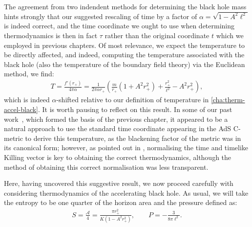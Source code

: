 \documentclass[
twoside,
openright,
frontopenright,
]{dmathesis}
\newcommand{\tcr}{\textcolor{red}}
\begin{document}
The agreement from two indendent methods for determining the black hole mass
hints strongly that our suggested rescaling of time by a factor of $\alpha =
\sqrt{1-A^2\ell^2}$ is indeed correct, and the time coordinate we ought to use
when determining thermodynamics is then in fact $\tau$ rather than the original
coordinate $t$ which we employed in previous chapters. Of most relevance, we
expect the temperature to be directly affected, and indeed, computing the
temperature associated with the black hole (also the temperature of the boundary
field theory) via the Euclidean method, we find:
\begin{align}
  T=\frac{f'(r_+)}{4\pi\alpha} = \frac{1}{2\pi \alpha r_+}\left(\frac{m}{r_+}\left(1+A^2r_+^2
\right) + \frac{r_+^2}{\ell^2} - A^2 r_+^2\right),
  \label{temp}
\end{align}
which is indeed $\alpha$-shifted relative to our definition of
temperature in \cref{cha:therm-accel-black}. It is worth pausing to reflect on
this result. In some of our past
work~\cite{Appels:2016uha,Appels:2017xoe,Gregory:2017ogk}, which formed the
basis of the previous chapter, it appeared to be a natural approach to use the
standard time coordinate appearing in the AdS C-metric to derive this
temperature, as the blackening factor of the metric was in its canonical form;
however, as pointed out in \cite{Gibbons:2004ai}, normalising the time and
timelike Killing vector is key to obtaining the correct thermodynamics, although
the method of obtaining this correct normalisation was less transparent.

Here, having uncovered this suggestive result, we now proceed carefully with
considering thermodynamics of the accelerating black hole. As usual, we will
take the entropy to be one quarter of the horizon area and the pressure defined as:
\begin{align}
S=\frac{\mathcal{A}}{4}=\frac{\pi r_+^2}{K(1-A^2r_+^2)}, \qquad P=-\frac{3}{8\pi\ell^2}.
\label{entropy}
\end{align}
\end{document}
